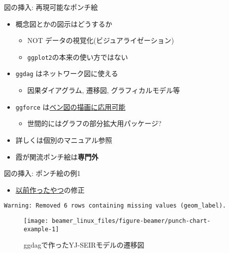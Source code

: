 \documentclass[
  12pt,
  ignorenonframetext,
]{beamer}
\providecommand{\tightlist}{%
  \setlength{\itemsep}{0pt}\setlength{\parskip}{0pt}}
\begin{document}
\begin{frame}[fragile]{図の挿入: 再現可能なポンチ絵}
\protect\hypertarget{ux56f3ux306eux633fux5165-ux518dux73feux53efux80fdux306aux30ddux30f3ux30c1ux7d75}{}

\begin{itemize}
\tightlist
\item
  概念図とかの図示はどうするか

  \begin{itemize}
  \tightlist
  \item
    NOT データの視覚化(ビジュアライゼーション)
  \item
    \texttt{ggplot2}の本来の使い方ではない
  \end{itemize}
\item
  \texttt{ggdag} はネットワーク図に使える

  \begin{itemize}
  \tightlist
  \item
    因果ダイアグラム, 遷移図, グラフィカルモデル等
  \end{itemize}
\item
  \texttt{ggforce}
  は\href{https://rpubs.com/sdutky/559050}{ベン図の描画に応用可能}

  \begin{itemize}
  \tightlist
  \item
    世間的にはグラフの部分拡大用パッケージ?
  \end{itemize}
\item
  詳しくは個別のマニュアル参照
\item
  霞が関流ポンチ絵は\textbf{専門外}
\end{itemize}

\end{frame}

\begin{frame}[fragile]{図の挿入: ポンチ絵の例1}
\protect\hypertarget{ux56f3ux306eux633fux5165-ux30ddux30f3ux30c1ux7d75ux306eux4f8b1}{}

\begin{itemize}
\tightlist
\item
  \href{https://speakerdeck.com/ktgrstsh/r-and-epidemical-mathematical-models}{以前作ったやつ}の修正
\end{itemize}

\begin{verbatim}
Warning: Removed 6 rows containing missing values (geom_label).
\end{verbatim}

\begin{figure}

{\centering \texttt{[image: beamer\_linux\_files/figure-beamer/punch-chart-example-1]} 

}

\caption{ggdagで作ったYJ-SEIRモデルの遷移図}\label{fig:punch-chart-example}
\end{figure}

\end{frame}
\end{document}
